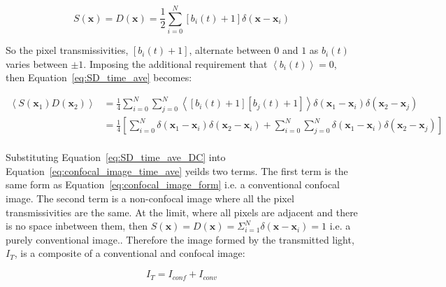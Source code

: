 \begin{equation}\label{eq:detector_aperture_time_DC}
	S\left(\textbf{x}\right) = D\left(\textbf{x}\right) = \frac{1}{2} \sum_{i=0}^{N} \left[b_{i}\left(t\right) + 1\right]\delta\left(\textbf{x} - \textbf{x}_{i}\right)
\end{equation} 

So the pixel transmissivities, $\left[b_{i}\left(t\right) + 1\right]$, alternate between $0$ and $1$ as $b_{i}\left(t\right)$ varies between $\pm1$. Imposing the additional requirement that $\left\langle b_{i}\left(t\right) \right\rangle = 0$, then Equation~\ref{eq:SD_time_ave} becomes:

\begin{equation}\label{eq:SD_time_ave_DC}
	\begin{split}
		\left\langle S\left(\textbf{x}_{1}\right) D\left(\textbf{x}_{2}\right)\right\rangle &= \frac{1}{4} \sum_{i=0}^{N}\sum_{j=0}^{N} \left\langle \left[b_{i}\left(t\right) + 1\right] \left[b_{j}\left(t\right) + 1\right] \right\rangle \delta\left(\textbf{x}_{1} - \textbf{x}_{i}\right) \delta\left(\textbf{x}_{2} - \textbf{x}_{j}\right)\\
		&= \frac{1}{4} \left[\sum_{i=0}^{N} \delta\left(\textbf{x}_{1} - \textbf{x}_{i}\right) \delta\left(\textbf{x}_{2} - \textbf{x}_{i}\right) + \sum_{i=0}^{N}\sum_{j=0}^{N} \delta\left(\textbf{x}_{1} - \textbf{x}_{i}\right) \delta\left(\textbf{x}_{2} - \textbf{x}_{j}\right)\right]\\
	\end{split}
\end{equation}

Substituting Equation~\ref{eq:SD_time_ave_DC} into Equation~\ref{eq:confocal_image_time_ave} yeilds two terms. The first term is the same form as Equation~\ref{eq:confocal_image_form} i.e. a conventional confocal image. The second term is a non-confocal image where all the pixel transmissivities are the same. At the limit, where all pixels are adjacent and there is no space inbetween them, then $S\left(\textbf{x}\right) = D\left(\textbf{x}\right) = \Sigma_{i=1}^{N}\delta\left(\textbf{x} - \textbf{x}_{i}\right) = 1$ i.e. a purely conventional image.\cite{juskaitis1996efficient,wilson1996confocal}. Therefore the image formed by the transmitted light, $I_{T}$, is a composite of a conventional and confocal image:

\begin{equation}\label{eq:transmitted_image}
	I_{T} = I_{conf} + I_{conv}
\end{equation}

